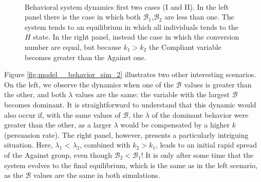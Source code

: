 \begin{figure}[ht]
	\centering
	 \quad
	 \\
	\caption[Behavioural model simulation first]{Behavioral system dynamics first two cases (I and II). In the left panel there is the case in which both $\mathcal{B}_1$,$\mathcal{B}_2$ are less than one. The system tends to an equilibrium in which all individuals tends to the $H$ state. In the right panel, instead the case in which the conversion number are equal, but because $k_1 > k_2$ the Compliant variable becomes greater than the Against one.}
	\label{fig:model__behavior_sim_1}
\end{figure}
\label{subsec:model_behav}

Figure \ref{fig:model__behavior_sim_2} illustrates two other interesting scenarios. On the left, we observe the dynamics when one of the $\mathcal{B}$ values is greater than the other, and both $\lambda$ values are the same: the variable with the largest $\mathcal{B}$ becomes dominant. It is straightforward to understand that this dynamic would also occur if, with the same values of $\mathcal{B}$, the $\lambda$ of the dominant behavior were greater than the other, as a larger $\lambda$ would be compensated by  a higher $k$ (persuasion rate). The right panel, however, presents a particularly intriguing situation. Here, $\lambda_1$ < $\lambda_2$, combined with $k_2 > k_1$, leads to an initial rapid spread of the Against group, even though $\mathcal{B}_2 < \mathcal{B}_1$! It is only after some time that the system evolves to the final equilibrium, which is the same as in the left scenario, as the $\mathcal{B}$ values are the same in both simulations.

